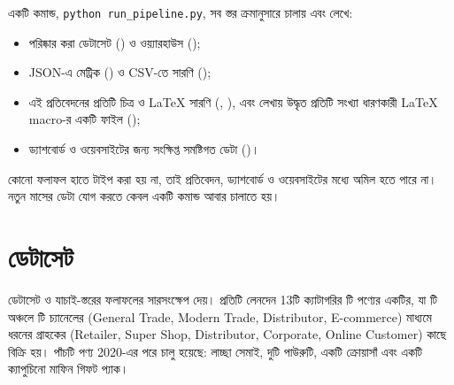 একটি কমান্ড, \texttt{python run\_pipeline.py}, সব স্তর ক্রমানুসারে চালায় এবং লেখে:
\begin{itemize}
  \item পরিষ্কার করা ডেটাসেট () ও ওয়্যারহাউস ();
  \item JSON-এ মেট্রিক () ও CSV-তে সারণি ();
  \item এই প্রতিবেদনের প্রতিটি চিত্র ও \LaTeX{} সারণি (, ), এবং লেখায় উদ্ধৃত প্রতিটি
        সংখ্যা ধারণকারী \LaTeX{} macro-র একটি ফাইল ();
  \item ড্যাশবোর্ড ও ওয়েবসাইটের জন্য সংক্ষিপ্ত সমষ্টিগত ডেটা ()।
\end{itemize}
কোনো ফলাফল হাতে টাইপ করা হয় না, তাই প্রতিবেদন, ড্যাশবোর্ড ও ওয়েবসাইটের মধ্যে অমিল হতে পারে না। নতুন মাসের ডেটা যোগ করতে
কেবল একটি কমান্ড আবার চালাতে হয়।

\section{ডেটাসেট}
 ডেটাসেট ও যাচাই-স্তরের ফলাফলের সারসংক্ষেপ দেয়। প্রতিটি লেনদেন 13টি ক্যাটাগরির \NProducts টি পণ্যের একটির,
যা \NRegions টি অঞ্চলে \NChannels টি চ্যানেলের (General Trade, Modern Trade, Distributor, E-commerce) মাধ্যমে \NCustTypes ধরনের
গ্রাহকের (Retailer, Super Shop, Distributor, Corporate, Online Customer) কাছে বিক্রি হয়। পাঁচটি পণ্য 2020-এর পরে চালু হয়েছে:
লাচ্ছা সেমাই, দুটি পাউরুটি, একটি ক্রোয়াসাঁ এবং একটি ক্যাপুচিনো মাফিন গিফট প্যাক।

